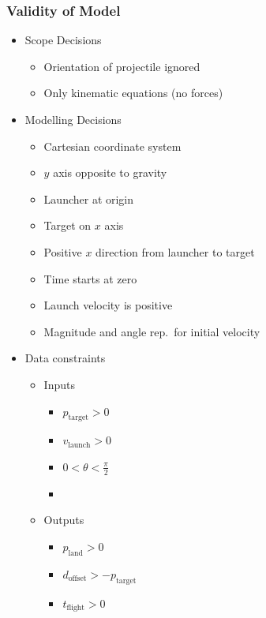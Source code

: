 \documentclass{beamer}
\begin{document}
\begin{frame}[allowframebreaks]

\frametitle{Validity of Model}
\begin{itemize}
\item Scope Decisions
\begin{itemize}
  \item Orientation of projectile ignored
  \item Only kinematic equations (no forces)
\end{itemize}
\item Modelling Decisions
\begin{itemize}
  \item Cartesian coordinate system
  \item $y$ axis opposite to gravity
  \item Launcher at origin
  \item Target on $x$ axis
  \item Positive $x$ direction from launcher to target
  \item Time starts at zero
  \item Launch velocity is positive
  \item Magnitude and angle rep.\ for initial velocity
\end{itemize}
\item Data constraints
\begin{itemize}
  \item Inputs
  \begin{itemize}
  \item $p_\text{target} > 0$
  \item $v_\text{launch} > 0$
  \item $0 < \theta < \frac{\pi}{2}$ 
  \item 
  \end{itemize}
  \item Outputs
  \begin{itemize}
  \item $p_\text{land} > 0$
  \item $d_\text{offset} > -p_\text{target}$
  \item $t_\text{flight} > 0$
  \end{itemize}
\end{itemize}


\end{itemize}
\end{frame}
\end{document}
